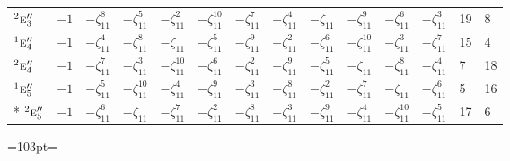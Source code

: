 \documentclass[10pt,a4paper]{article}
\newcommand{\needspace}[1]{\par\penalty-100\begingroup\dimen0=#1\relax\dimen2=\pagegoal
  \advance\dimen2-\pagetotal\ifdim\dimen0>\dimen2\relax\ifdim\dimen2>0pt\vfil\break\fi\fi
  \endgroup}
\numberwithin{equation}{section}
\newcommand{\irr}[1]{\text{\normalfont\scshape #1}}
\newcommand{\conjpair}[1]{{}^{#1}}
\newcommand{\rootunity}[1]{\zeta_{#1}}
\begin{document}
{\begin{longtable}{@{}lcccccccccccll@{}}
$\conjpair{2}\irr{e}_{3}''$ & $-1$ & $-\rootunity{11}^{8}$ & $-\rootunity{11}^{5}$ & $-\rootunity{11}^{2}$ & $-\rootunity{11}^{10}$ & $-\rootunity{11}^{7}$ & $-\rootunity{11}^{4}$ & $-\rootunity{11}$ & $-\rootunity{11}^{9}$ & $-\rootunity{11}^{6}$ & $-\rootunity{11}^{3}$ & 19 & 8\\
$\conjpair{1}\irr{e}_{4}''$ & $-1$ & $-\rootunity{11}^{4}$ & $-\rootunity{11}^{8}$ & $-\rootunity{11}$ & $-\rootunity{11}^{5}$ & $-\rootunity{11}^{9}$ & $-\rootunity{11}^{2}$ & $-\rootunity{11}^{6}$ & $-\rootunity{11}^{10}$ & $-\rootunity{11}^{3}$ & $-\rootunity{11}^{7}$ & 15 & 4\\
$\conjpair{2}\irr{e}_{4}''$ & $-1$ & $-\rootunity{11}^{7}$ & $-\rootunity{11}^{3}$ & $-\rootunity{11}^{10}$ & $-\rootunity{11}^{6}$ & $-\rootunity{11}^{2}$ & $-\rootunity{11}^{9}$ & $-\rootunity{11}^{5}$ & $-\rootunity{11}$ & $-\rootunity{11}^{8}$ & $-\rootunity{11}^{4}$ & 7 & 18\\
$\conjpair{1}\irr{e}_{5}''$ & $-1$ & $-\rootunity{11}^{5}$ & $-\rootunity{11}^{10}$ & $-\rootunity{11}^{4}$ & $-\rootunity{11}^{9}$ & $-\rootunity{11}^{3}$ & $-\rootunity{11}^{8}$ & $-\rootunity{11}^{2}$ & $-\rootunity{11}^{7}$ & $-\rootunity{11}$ & $-\rootunity{11}^{6}$ & 5 & 16\\*
$\conjpair{2}\irr{e}_{5}''$ & $-1$ & $-\rootunity{11}^{6}$ & $-\rootunity{11}$ & $-\rootunity{11}^{7}$ & $-\rootunity{11}^{2}$ & $-\rootunity{11}^{8}$ & $-\rootunity{11}^{3}$ & $-\rootunity{11}^{9}$ & $-\rootunity{11}^{4}$ & $-\rootunity{11}^{10}$ & $-\rootunity{11}^{5}$ & 17 & 6\\
\bottomrule\end{longtable}}
\needspace{103pt}
\end{document}
